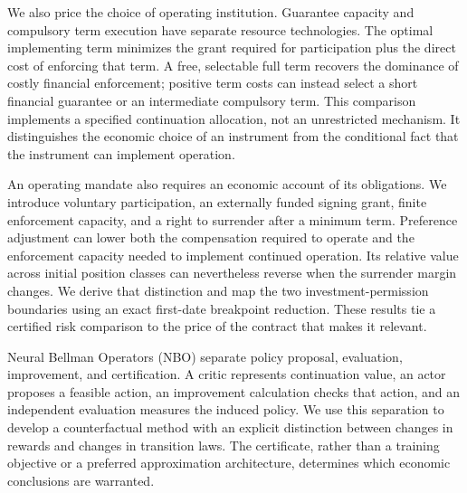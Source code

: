 We also price the choice of operating institution. Guarantee capacity and compulsory term execution have separate resource technologies. The optimal implementing term minimizes the grant required for participation plus the direct cost of enforcing that term. A free, selectable full term recovers the dominance of costly financial enforcement; positive term costs can instead select a short financial guarantee or an intermediate compulsory term. This comparison implements a specified continuation allocation, not an unrestricted mechanism. It distinguishes the economic choice of an instrument from the conditional fact that the instrument can implement operation.


An operating mandate also requires an economic account of its obligations. We introduce voluntary participation, an externally funded signing grant, finite enforcement capacity, and a right to surrender after a minimum term. Preference adjustment can lower both the compensation required to operate and the enforcement capacity needed to implement continued operation. Its relative value across initial position classes can nevertheless reverse when the surrender margin changes. We derive that distinction and map the two investment-permission boundaries using an exact first-date breakpoint reduction. These results tie a certified risk comparison to the price of the contract that makes it relevant.

Neural Bellman Operators (NBO) separate policy proposal, evaluation, improvement, and certification. A critic represents continuation value, an actor proposes a feasible action, an improvement calculation checks that action, and an independent evaluation measures the induced policy. We use this separation to develop a counterfactual method with an explicit distinction between changes in rewards and changes in transition laws. The certificate, rather than a training objective or a preferred approximation architecture, determines which economic conclusions are warranted.

